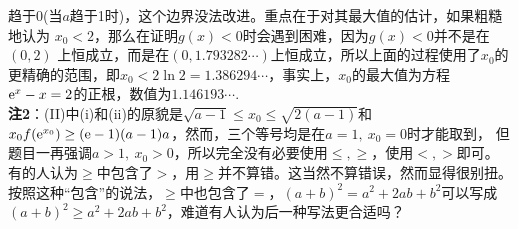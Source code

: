 \begin{enumerate}[label={【\textbf{例\thechapter.\arabic*}】},
 leftmargin=\inteval{\myenumleftmargin}pt,
 itemsep=\inteval{\myenumitempsep}pt,
 itemindent=\inteval{\myenumitemindent}pt]
趋于0(当$ a $趋于1时)，这个边界没法改进。重点在于对其最大值的估计，如果粗糙地认为
$ x_0<2 $，那么在证明$ g(x)<0 $时会遇到困难，因为$ g(x)<0 $并不是在$ (0,2) $
上恒成立，而是在$ (0,1.793282\cdots) $上恒成立，所以上面的过程使用了$ x_0 $的更精确的范围，即$ x_0<2\ln2=1.386294\cdots $，事实上，$ x_0 $的最大值为方程$ \mathrm{e}^x-x=2 $的正根，数值为$ 1.146193\cdots $.\\
\textbf{注2}：(II)中(i)和(ii)的原貌是$ \sqrt{a-1}\leq x_0 \leq \sqrt{2(a-1)} $和
$ x_0f(\mathrm{e}^{x_0})\geq (\mathrm{e}-1)(a-1)a $，然而，三个等号均是在$ a=1,\ x_0=0 $时才能取到，
但题目一再强调$ a>1,\ x_0>0 $，所以完全没有必要使用$ \leq,\geq $，使用$ <,> $即可。
有的人认为$ \geq $中包含了$ > $，用$ \geq $并不算错。这当然不算错误，然而显得很别扭。按照这种“包含”的说法，$ \geq $中也包含了$ = $，$ (a+b)^2=a^2+2ab+b^2 $可以写成$ (a+b)^2\geq a^2+2ab+b^2 $，难道有人认为后一种写法更合适吗？


\end{enumerate}
